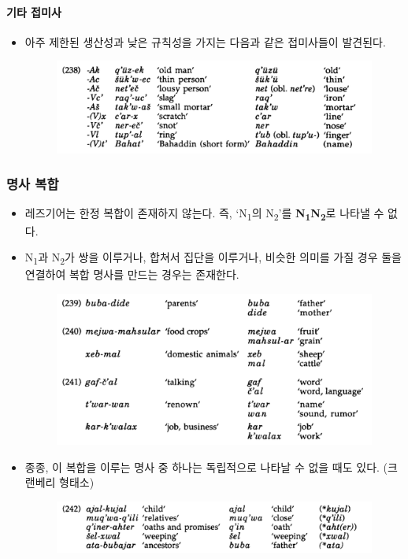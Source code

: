 \paragraph{기타 접미사}
\begin{itemize}
\item 아주 제한된 생산성과 낮은 규칙성을 가지는 다음과 같은 접미사들이 발견된다.
\begin{figure}[H]
\centerline{\includegraphics[width=.8\linewidth]{Lezgian/src/ex238.png}}
\end{figure}
\end{itemize}

\subsubsection{명사 복합}
\begin{itemize}
\item 레즈기어는 한정 복합이 존재하지 않는다. 즉, `N\textsubscript{1}의 N\textsubscript{2}'를 \textbf{N\textsubscript{1}N\textsubscript{2}}로 나타낼 수 없다.
\item N\textsubscript{1}과 N\textsubscript{2}가 쌍을 이루거나, 합쳐서 집단을 이루거나, 비슷한 의미를 가질 경우 둘을 연결하여 복합 명사를 만드는 경우는 존재한다.
\begin{figure}[H]
\centerline{\includegraphics[width=.8\linewidth]{Lezgian/src/ex7-3-2.png}}
\end{figure}
\item 종종, 이 복합을 이루는 명사 중 하나는 독립적으로 나타날 수 없을 때도 있다. (크랜베리 형태소)
\begin{figure}[H]
\centerline{\includegraphics[width=.8\linewidth]{Lezgian/src/ex242.png}}
\end{figure}
\end{itemize}

